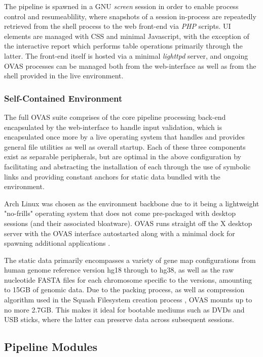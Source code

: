 \documentclass{bioinfo}
\def\app{OVAS}
\begin{document}
\begin{methods}
The pipeline is spawned in a GNU \textit{screen} session in order to enable process control and resumeablility, where snapshots of a session in-process are repeatedly retrieved from the shell process to the web front-end via \textit{PHP} scripts. UI elements are managed with CSS and minimal Javascript, with the exception of the interactive report which performs table operations primarily through the latter. The front-end itself is hosted via a minimal \textit{lighttpd} server, and ongoing \app{} processes can be managed both from the web-interface as well as from the shell provided in the live environment.


\subsubsection{Self-Contained Environment}

The full \app{} suite comprises of the core pipeline processing back-end encapsulated by the web-interface to handle input validation, which is encapsulated once more by a live operating system that handles and provides general file utilities as well as overall startup. Each of these three components exist as separable peripherals, but are optimal in the above configuration by facilitating and abstracting the installation of each through the use of symbolic links and providing constant anchors for static data bundled with the environment.

Arch Linux was chosen as the environment backbone due to it being a lightweight "no-frills" operating system that does not come pre-packaged with desktop sessions (and their associated bloatware). \app{} runs straight off the X desktop server with the \app{} interface autostarted along with a minimal dock for spawning additional applications \citep{scheifler1986x}.

The static data primarily encompasses a variety of gene map configurations from human genome reference version hg18 through to hg38, as well as the raw nucleotide FASTA files for each chromosome specific to the versions, amounting to 15GB of genomic data. Due to the packing process, as well as compression algorithm used in the Squash Filesystem creation process \citep{lougher2008squashfs}, \app{} mounts up to no more 2.7GB. This makes it ideal for bootable mediums such as DVDs and USB sticks, where the latter can preserve data across subsequent sessions.



\subsection{Pipeline Modules}


\end{methods}
\end{document}

